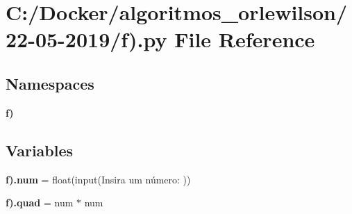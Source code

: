 \section{C\+:/\+Docker/algoritmos\+\_\+orlewilson/22-\/05-\/2019/f).py File Reference}
\label{f_08_8py}
\subsection*{Namespaces}
\begin{DoxyCompactItemize}
\item 
 \textbf{ f)}
\end{DoxyCompactItemize}
\subsection*{Variables}
\begin{DoxyCompactItemize}
\item 
\textbf{ f).\+num} = float(input(\textquotesingle{}Insira um número\+: \textquotesingle{}))
\item 
\textbf{ f).\+quad} = num $\ast$ num
\end{DoxyCompactItemize}

